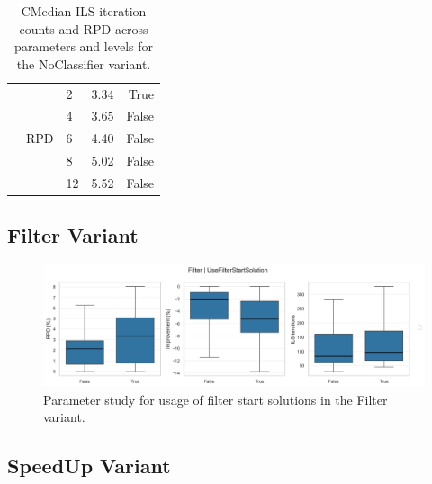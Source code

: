 \begin{table}[!ht]
\begin{tabular}{l|l|l|r|r}
		                                            & \multirow{5}{*}{RPD}           & 2                     & 3.34            & True            \\\cline{3-5}
		                                            &                                & 4                     & 3.65            & False           \\\cline{3-5}
		                                            &                                & 6                     & 4.40            & False           \\\cline{3-5}
		                                            &                                & 8                     & 5.02            & False           \\\cline{3-5}
		                                            &                                & 12                    & 5.52            & False           \\
	\end{tabular}


	\caption{CMedian ILS iteration counts and RPD across parameters and levels for the NoClassifier variant.}
	\label{tab:numerical_results_paramStudy_NOclassifiers}
\end{table}
\clearpage
\subsection{Filter Variant}
\label{app:subsec:parameterstudy_Filter}

\begin{figure}[!ht]
	\centering
	\includegraphics[width=\linewidth]{pictures/parameter_study/UseFilterStartSolution_Filter_parameter_study.png}
	\caption{Parameter study for usage of filter start solutions in the Filter variant.}
	\label{fig:parameter_study_filter}
\end{figure}


\subsection{SpeedUp Variant}
\label{app:subsec:parameterstudy_SpeedUp}

